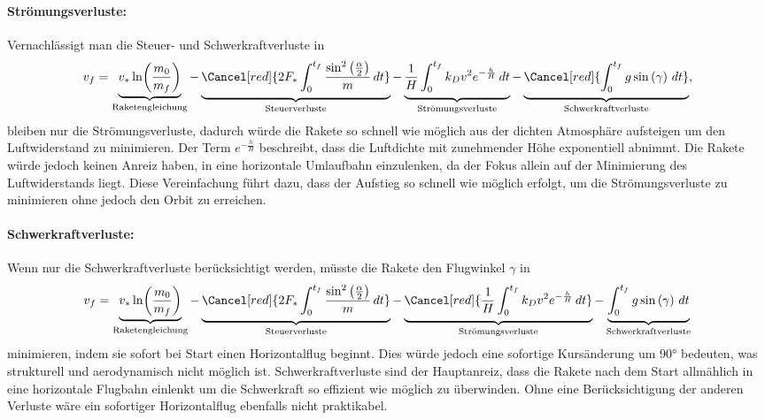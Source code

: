 \paragraph{Strömungsverluste:}Vernachlässigt man die Steuer- und Schwerkraftverluste in  
\begin{equation*}
v_f
=
\underbrace{v_* \ln \biggl(\frac{m_0}{m_f}\biggr)}_{\text{Raketengleichung}} 
-
\underbrace{\Cancel[red]{2F_* \int_{0\mathstrut}^{t_f} \frac{\sin^2\left(\frac{\alpha}{2}\right)}{m} \, dt }}_{\text{Steuerverluste}}
-
\underbrace{\frac{1}{H} \int_{0\mathstrut}^{t_f} k_Dv^2 e^{-\frac{h}{H}} \, dt }_{\text{Strömungsverluste}}
-
\underbrace{\Cancel[red]{\int_{0\mathstrut}^{t_f} g \sin \left(\gamma\right) \, dt}}_{\text{Schwerkraftverluste}},
\end{equation*}
bleiben nur die Strömungsverluste, dadurch würde die Rakete so schnell wie möglich aus der dichten Atmosphäre aufsteigen um den Luftwiderstand zu minimieren. 
Der Term $e^{-\frac{h}{H}}$ beschreibt, dass die Luftdichte mit zunehmender Höhe exponentiell abnimmt. 
%
Die Rakete würde jedoch keinen Anreiz haben, in eine horizontale Umlaufbahn einzulenken, da der Fokus allein auf der Minimierung des Luftwiderstands liegt.
Diese Vereinfachung führt dazu, dass der Aufstieg so schnell wie möglich erfolgt, um die Strömungsverluste zu minimieren ohne jedoch den Orbit zu erreichen.

\paragraph{Schwerkraftverluste:}Wenn nur die Schwerkraftverluste berücksichtigt werden, müsste die Rakete den Flugwinkel \(\gamma\) in
\begin{equation*}
v_f
=
\underbrace{v_* \ln \biggl(\frac{m_0}{m_f}\biggr)}_{\text{Raketengleichung}} 
-
\underbrace{\Cancel[red]{2F_* \int_{0\mathstrut}^{t_f} \frac{\sin^2\left(\frac{\alpha}{2}\right)}{m} \, dt }}_{\text{Steuerverluste}}
-
\underbrace{\Cancel[red]{\frac{1}{H} \int_{0\mathstrut}^{t_f} k_Dv^2 e^{-\frac{h}{H}} \, dt }}_{\text{Strömungsverluste}}
-
\underbrace{\int_{0\mathstrut}^{t_f} g \sin \left(\gamma\right) \, dt}_{\text{Schwerkraftverluste}}
\end{equation*}
minimieren, indem sie sofort bei Start einen Horizontalflug beginnt. 
Dies würde jedoch eine sofortige Kursänderung um 90° bedeuten, was strukturell und aerodynamisch nicht möglich ist. 
Schwerkraftverluste sind der Hauptanreiz, dass die Rakete nach dem Start allmählich in eine horizontale Flugbahn einlenkt um die Schwerkraft so effizient wie möglich zu überwinden.
Ohne eine Berücksichtigung der anderen Verluste wäre ein sofortiger Horizontalflug ebenfalls nicht praktikabel.


